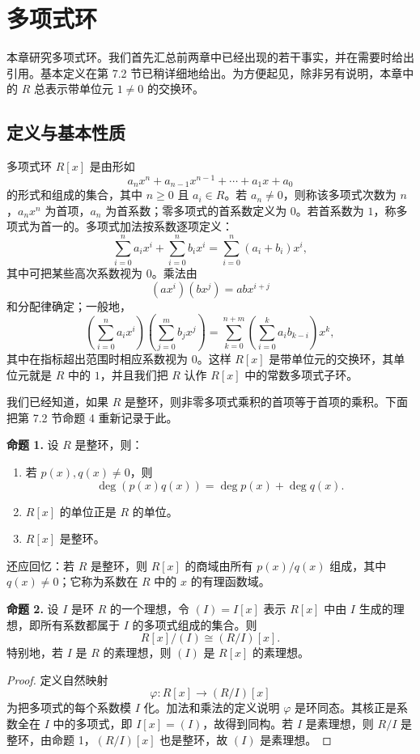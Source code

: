 \chapter{多项式环}

本章研究多项式环。我们首先汇总前两章中已经出现的若干事实，并在需要时给出引用。基本定义在第 7.2 节已稍详细地给出。为方便起见，除非另有说明，本章中的 $R$ 总表示带单位元 $1\neq0$ 的交换环。

\section{定义与基本性质}

多项式环 $R[x]$ 是由形如
\[
a_nx^n+a_{n-1}x^{n-1}+\cdots+a_1x+a_0
\]
的形式和组成的集合，其中 $n\geq0$ 且 $a_i\in R$。若 $a_n\neq0$，则称该多项式次数为 $n$，$a_nx^n$ 为首项，$a_n$ 为首系数；零多项式的首系数定义为 $0$。若首系数为 $1$，称多项式为首一的。多项式加法按系数逐项定义：
\[
\sum_{i=0}^n a_ix^i+\sum_{i=0}^n b_ix^i
=\sum_{i=0}^n (a_i+b_i)x^i,
\]
其中可把某些高次系数视为 $0$。乘法由
\[
(ax^i)(bx^j)=abx^{i+j}
\]
和分配律确定；一般地，
\[
\left(\sum_{i=0}^n a_i x^i\right)\left(\sum_{j=0}^m b_jx^j\right)
=\sum_{k=0}^{n+m}\left(\sum_{i=0}^k a_i b_{k-i}\right)x^k,
\]
其中在指标超出范围时相应系数视为 $0$。这样 $R[x]$ 是带单位元的交换环，其单位元就是 $R$ 中的 $1$，并且我们把 $R$ 认作 $R[x]$ 中的常数多项式子环。

我们已经知道，如果 $R$ 是整环，则非零多项式乘积的首项等于首项的乘积。下面把第 7.2 节命题 4 重新记录于此。

\noindent\textbf{命题 1.} 设 $R$ 是整环，则：
\begin{enumerate}[label=(\arabic*)]
	\item 若 $p(x),q(x)\neq0$，则
	\[
	\deg(p(x)q(x))=\deg p(x)+\deg q(x).
	\]
	\item $R[x]$ 的单位正是 $R$ 的单位。
	\item $R[x]$ 是整环。
\end{enumerate}

还应回忆：若 $R$ 是整环，则 $R[x]$ 的商域由所有 $p(x)/q(x)$ 组成，其中 $q(x)\neq0$；它称为系数在 $R$ 中的 $x$ 的有理函数域。

\noindent\textbf{命题 2.} 设 $I$ 是环 $R$ 的一个理想，令 $(I)=I[x]$ 表示 $R[x]$ 中由 $I$ 生成的理想，即所有系数都属于 $I$ 的多项式组成的集合。则
\[
R[x]/(I)\cong (R/I)[x].
\]
特别地，若 $I$ 是 $R$ 的素理想，则 $(I)$ 是 $R[x]$ 的素理想。

\begin{proof}
	定义自然映射
	\[
	\varphi:R[x]\longrightarrow (R/I)[x]
	\]
	为把多项式的每个系数模 $I$ 化。加法和乘法的定义说明 $\varphi$ 是环同态。其核正是系数全在 $I$ 中的多项式，即 $I[x]=(I)$，故得到同构。若 $I$ 是素理想，则 $R/I$ 是整环，由命题 1，$(R/I)[x]$ 也是整环，故 $(I)$ 是素理想。
\end{proof}

